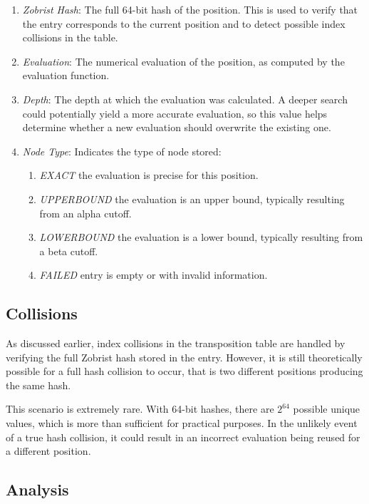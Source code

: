 \begin{enumerate}
  \item \textit{Zobrist Hash}: The full 64-bit hash of the position. This is used to verify that the entry corresponds to the current position and to detect possible index collisions in the table.
  \item \textit{Evaluation}: The numerical evaluation of the position, as computed by the evaluation function.
  \item \textit{Depth}: The depth at which the evaluation was calculated. A deeper search could potentially yield a more accurate evaluation, so this value helps determine whether a new evaluation should overwrite the existing one.
  \item \textit{Node Type}: Indicates the type of node stored:
  \begin{enumerate}
    \item \textit{EXACT} the evaluation is precise for this position.
    \item \textit{UPPERBOUND} the evaluation is an upper bound, typically resulting from an alpha cutoff.
    \item \textit{LOWERBOUND} the evaluation is a lower bound, typically resulting from a beta cutoff.
    \item \textit{FAILED} entry is empty or with invalid information.
  \end{enumerate}
\end{enumerate}

\subsection{Collisions}

As discussed earlier, index collisions in the transposition table are handled by verifying the full Zobrist hash stored in the entry. However, it is still theoretically possible for a full hash collision to occur, that is two different positions producing the same hash.

\vspace{1em}

\noindent This scenario is extremely rare. With 64-bit hashes, there are $2^{64}$ possible unique values, which is more than sufficient for practical purposes. In the unlikely event of a true hash collision, it could result in an incorrect evaluation being reused for a different position.

\subsection{Analysis}

